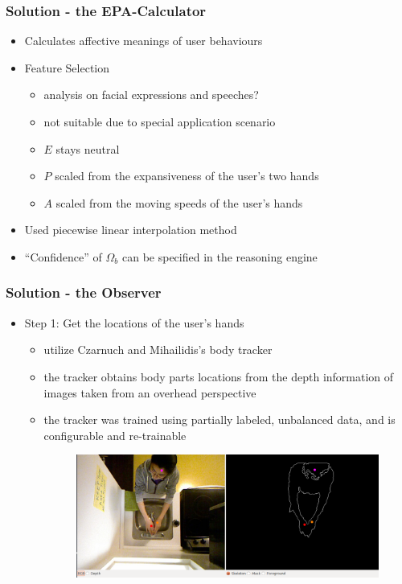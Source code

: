 \documentclass{beamer}
\begin{document}
\begin{frame}
\frametitle{Solution - the EPA-Calculator}
\begin{itemize}
\item Calculates affective meanings of user behaviours
\vspace{.3cm}
\item Feature Selection
\begin{itemize}
\item analysis on facial expressions and speeches?
\item not suitable due to special application scenario
\item $E$ stays neutral
\item $P$ scaled from the expansiveness of the user's two hands
\item $A$ scaled from the moving speeds of the user's hands
\end{itemize}
\vspace{.3cm}
\item Used piecewise linear interpolation method
\vspace{.3cm}
\item ``Confidence'' of $\Omega_b$ can be specified in the reasoning engine
\end{itemize}
\end{frame}


\begin{frame}
\frametitle{Solution - the Observer}
\begin{itemize}
\item Step 1: Get the locations of the user's hands
\begin{itemize}
\item utilize Czarnuch and Mihailidis's body tracker \cite{czarnuch2014}
\item the tracker obtains body parts locations from the depth information of images taken from an overhead perspective
\item the tracker was trained using partially labeled, unbalanced data, and is configurable and re-trainable\\
\begin{figure}[htb]
\centering
\includegraphics[width=0.9\linewidth]{fig/handtracker-performance.png}
\end{figure}
\end{itemize}
\end{itemize}
\end{frame}
\end{document}
